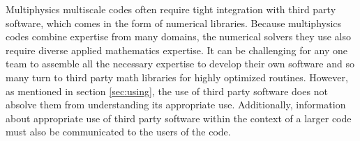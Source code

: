 Multiphysics multiscale codes often require tight integration with third party software, which comes
in the form of numerical libraries. Because multiphysics codes combine
expertise from many domains, the numerical solvers they use also
require diverse applied mathematics expertise. It can be challenging 
for any one team to assemble all the necessary expertise to develop their own software and so many turn to third party math libraries for highly optimized routines.  However, as mentioned in section \ref{sec:using}, the use of
third party software does not absolve them from understanding its appropriate
use.  Additionally, information about appropriate use of third party
software within the context of a larger code must also be communicated
to the users of the code. 




